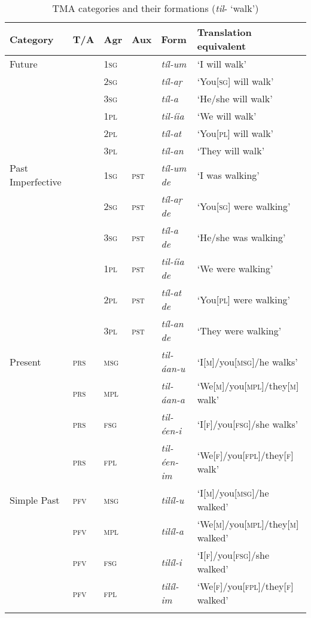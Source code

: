 \begin{sidewaystable}[p!]
\caption{TMA categories and their formations (\textit{til}- `walk')}
\begin{tabularx}{\textwidth}{ l l l l l l }
\lsptoprule
Category &
T/A &
Agr &
Aux &
Form &
Translation equivalent\\\hline
Future &
&
\textsc{1sg} &
&
\textit{tíl-um} &
`I will walk' \\
&
&
\textsc{2sg} &
&
\textit{tíl-aṛ} &
`You[\textsc{sg}] will walk' \\
&
&
\textsc{3sg} &
&
\textit{tíl-a} &
`He/she will walk' \\
&
&
\textsc{1pl} &
&
\textit{til-íia} &
`We will walk' \\
&
&
\textsc{2pl} &
&
\textit{tíl-at} &
`You[\textsc{pl}] will walk' \\
&
&
\textsc{3pl} &
&
\textit{tíl-an} &
`They will walk' \\
Past Imperfective &
&
\textsc{1sg} &
\textsc{pst} &
\textit{tíl-um de} &
`I was walking' \\
&
&
\textsc{2sg} &
\textsc{pst} &
\textit{tíl-aṛ de} &
`You[\textsc{sg}] were walking' \\
&
&
\textsc{3sg} &
\textsc{pst} &
\textit{tíl-a de} &
`He/she was walking' \\
&
&
\textsc{1pl} &
\textsc{pst} &
\textit{til-íia de} &
`We were walking' \\
&
&
\textsc{2pl} &
\textsc{pst} &
\textit{tíl-at de} &
`You[\textsc{pl}] were walking' \\
&
&
\textsc{3pl} &
\textsc{pst} &
\textit{tíl-an de} &
`They were walking' \\
Present &
\textsc{prs} &
\textsc{msg} &
&
\textit{til-áan-u} &
`I[\textsc{m}]/you[\textsc{msg}]/he walks' \\
&
\textsc{prs} &
\textsc{mpl} &
&
\textit{til-áan-a} &
`We[\textsc{m}]/you[\textsc{mpl}]/they[\textsc{m}] walk' \\
&
\textsc{prs} &
\textsc{fsg} &
&
\textit{til-éen-i} &
`I[\textsc{f}]/you[\textsc{fsg}]/she walks' \\
&
\textsc{prs} &
\textsc{fpl} &
&
\textit{til-éen-im} &
`We[\textsc{f}]/you[\textsc{fpl}]/they[\textsc{f}] walk' \\
Simple Past &
\textsc{pfv} &
\textsc{msg} &
&
\textit{tilíl-u} &
`I[\textsc{m}]/you[\textsc{msg}]/he walked' \\
&
\textsc{pfv} &
\textsc{mpl} &
&
\textit{tilíl-a} &
`We[\textsc{m}]/you[\textsc{mpl}]/they[\textsc{m}] walked' \\
&
\textsc{pfv} &
\textsc{fsg} &
&
\textit{tilíl-i} &
`I[\textsc{f}]/you[\textsc{fsg}]/she walked' \\
&
\textsc{pfv} &
\textsc{fpl} &
&
\textit{tilíl-im} &
`We[\textsc{f}]/you[\textsc{fpl}]/they[\textsc{f}] walked' 
\\\lspbottomrule
\end{tabularx}
\end{sidewaystable}

